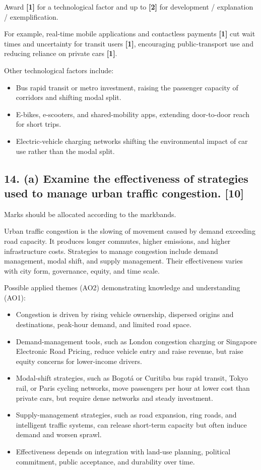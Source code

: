 \documentclass[11pt,a4paper]{article}
\newcommand{\term}[1]{\textbf{#1}}
\begin{document}
Award \term{[1]} for a technological factor and up to \term{[2]} for
development / explanation / exemplification.

For example, real-time mobile applications and contactless payments
\term{[1]} cut wait times and uncertainty for transit users \term{[1]},
encouraging public-transport use and reducing reliance on private cars
\term{[1]}.

Other technological factors include:
\begin{itemize}
  \item Bus rapid transit or metro investment, raising the passenger capacity
  of corridors and shifting modal split.
  \item E-bikes, e-scooters, and shared-mobility apps, extending door-to-door
  reach for short trips.
  \item Electric-vehicle charging networks shifting the environmental impact
  of car use rather than the modal split.
\end{itemize}

\newpage

\subsection*{14. (a) Examine the effectiveness of strategies used to manage urban traffic congestion. \hfill[10]}

Marks should be allocated according to the markbands.

Urban traffic congestion is the slowing of movement caused by demand exceeding
road capacity. It produces longer commutes, higher emissions, and higher
infrastructure costs. Strategies to manage congestion include demand management,
modal shift, and supply management. Their effectiveness varies with city form,
governance, equity, and time scale.

Possible applied themes (AO2) demonstrating knowledge and understanding (AO1):
\begin{itemize}
  \item Congestion is driven by rising vehicle ownership, dispersed origins and
  destinations, peak-hour demand, and limited road space.
  \item Demand-management tools, such as London congestion charging or
  Singapore Electronic Road Pricing, reduce vehicle entry and raise revenue,
  but raise equity concerns for lower-income drivers.
  \item Modal-shift strategies, such as Bogot\'{a} or Curitiba bus rapid
  transit, Tokyo rail, or Paris cycling networks, move passengers per hour at
  lower cost than private cars, but require dense networks and steady
  investment.
  \item Supply-management strategies, such as road expansion, ring roads, and
  intelligent traffic systems, can release short-term capacity but often induce
  demand and worsen sprawl.
  \item Effectiveness depends on integration with land-use planning, political
  commitment, public acceptance, and durability over time.
\end{itemize}
\end{document}

